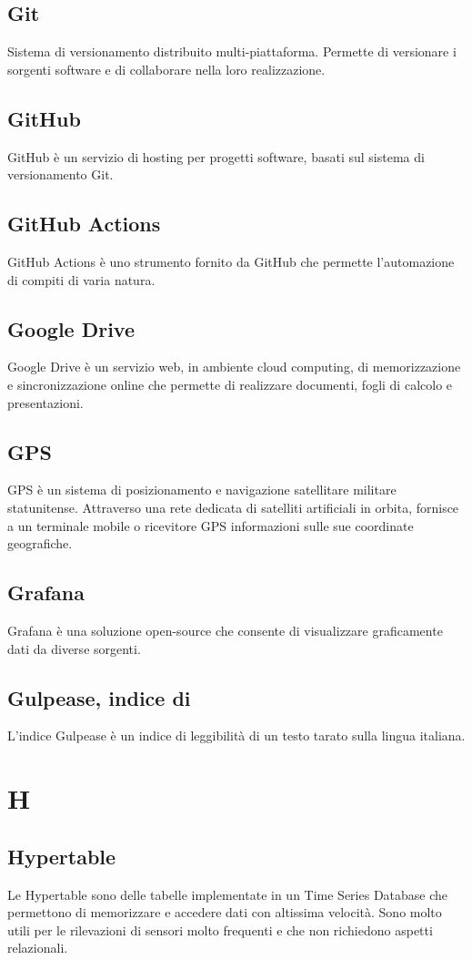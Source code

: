 \subsection{Git}  Sistema di versionamento distribuito multi-piattaforma. Permette di versionare i sorgenti software e di collaborare nella loro realizzazione.
\subsection{GitHub}  GitHub è un servizio di hosting per progetti software, basati sul sistema di versionamento Git.
\subsection{GitHub Actions}  GitHub Actions è uno strumento fornito da GitHub che permette l'automazione di compiti di varia natura.
\subsection{Google Drive}  Google Drive è un servizio web, in ambiente cloud computing, di memorizzazione e sincronizzazione online che permette di realizzare documenti, fogli di calcolo e presentazioni.
\subsection{GPS}  GPS è un sistema di posizionamento e navigazione satellitare militare statunitense. Attraverso una rete dedicata di satelliti artificiali in orbita, fornisce a un terminale mobile o ricevitore GPS informazioni sulle sue coordinate geografiche.
\subsection{Grafana}  Grafana è una soluzione open-source che consente di visualizzare graficamente dati da diverse sorgenti.
\subsection{Gulpease, indice di}  L'indice Gulpease è un indice di leggibilità di un testo tarato sulla lingua italiana.


\newpage \section{H}
\subsection{Hypertable}  Le Hypertable sono delle tabelle implementate in un Time Series Database che permettono di memorizzare e accedere dati con altissima velocità. Sono molto utili per le rilevazioni di sensori molto frequenti e che non richiedono aspetti relazionali.

